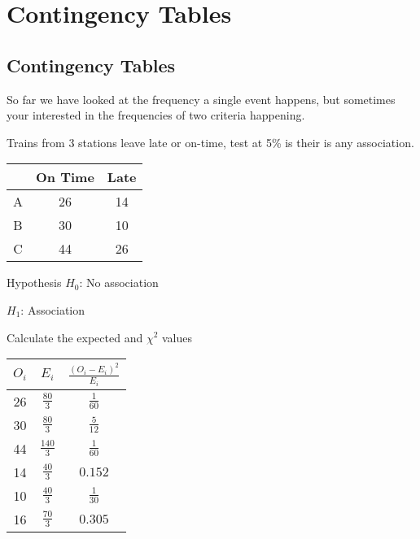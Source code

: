 
\section{Contingency Tables}

    \subsection{Contingency Tables}
        So far we have looked at the frequency a single event happens, but sometimes your interested in the frequencies of two criteria happening.
        
        \begin{example}
        {
            Trains from 3 stations leave late or on-time, test at 5\% is their is any association.\\
        
            \begin{center}
            \begin{tabular}{c|c|c}
                  & On Time & Late \\
                \hline
                A & 26      & 14   \\
                B & 30      & 10   \\
                C & 44      & 26   \\
            \end{tabular}
            \end{center}
        }
        
        
        \begin{step}{Hypothesis}
        $H_0$: No association
        
        $H_1$: Association
        \end{step}
        
        \begin{step}{Calculate the expected and $\chi^2$ values}
        \begin{center}
        \begin{tabular}{c|c|c}
            $O_i$ & $E_i$           & $\displaystyle\frac{(O_i - E_i)^2}{E_i}$   \\[2ex]
            \hline
            \rule{0pt}{3.5ex} 
            26    & $\frac{80}{3}$  & $\frac{1}{60}$                \\[1ex]
            30    & $\frac{80}{3}$  & $\frac{5}{12}$                \\[1ex]
            44    & $\frac{140}{3}$ & $\frac{1}{60}$                \\[1ex]
            14    & $\frac{40}{3}$  & $0.152$                       \\[1ex]
            10    & $\frac{40}{3}$  & $\frac{1}{30}$                \\[1ex]
            16    & $\frac{70}{3}$  & $0.305$                       \\[1ex]
        \end{tabular}
        \end{center}
        \end{step}
    

\end{example}
